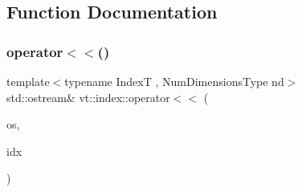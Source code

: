 \subsection{Function Documentation}
\mbox{\label{namespacevt_1_1index_a5bf333293029702c6e66c1faee749df8}} 
\subsubsection{\texorpdfstring{operator$<$$<$()}{operator<<()}}
{\footnotesize\ttfamily template$<$typename IndexT , Num\+Dimensions\+Type nd$>$ \\
std\+::ostream\& vt\+::index\+::operator$<$$<$ (\begin{DoxyParamCaption}\item[{std\+::ostream \&}]{os,  }\item[{\+::\hyperlink{structvt_1_1index_1_1_dense_index_array}{vt\+::index\+::\+Dense\+Index\+Array}$<$ IndexT, nd $>$ const \&}]{idx }\end{DoxyParamCaption})}

